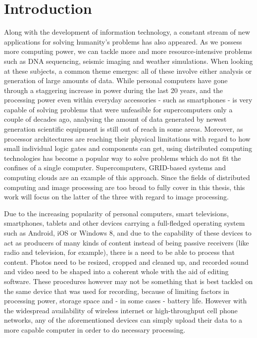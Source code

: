 \documentclass [12pt,a4paper]{report}
\begin{document}

\tableofcontents

\chapter{Introduction}

Along with the development of information technology, a constant stream of new applications for solving humanity's problems has also appeared. As we possess more computing power, we can tackle more and more resource-intensive problems such as DNA sequencing, seismic imaging and weather simulations. When looking at these subjects, a common theme emerges: all of these involve either analysis or generation of large amounts of data. While personal computers have gone through a staggering increase in power during the last 20 years, and the processing power even within everyday accessories - such as smartphones - is very capable of solving problems that were unfeasible for supercomputers only a couple of decades ago, analysing the amount of data generated by newest generation scientific equipment is still out of reach in some areas. Moreover, as processor architectures are reaching their physical limitations with regard to how small individual logic gates and components can get, using distributed computing technologies has become a popular way to solve problems which do not fit the confines of a single computer. Supercomputers, GRID-based systems and computing clouds are an example of this approach. Since the fields of distributed computing and image processing are too broad to fully cover in this thesis, this work will focus on the latter of the three with regard to image processing.

Due to the increasing popularity of personal computers, smart televisions, smartphones, tablets and other devices carrying a full-fledged operating system such as Android, iOS or Windows 8, and due to the capability of these devices to act as producers of many kinds of content instead of being passive receivers (like radio and television, for example), there is a need to be able to process that content. Photos need to be resized, cropped and cleaned up, and recorded sound and video need to be shaped into a coherent whole with the aid of editing software. These procedures however may not be something that is best tackled on the same device that was used for recording, because of limiting factors in processing power, storage space and - in some cases - battery life. However with the widespread availability of wireless internet or high-throughput cell phone networks, any of the aforementioned devices can simply upload their data to a more capable computer in order to do necessary processing. 
\end{document}
